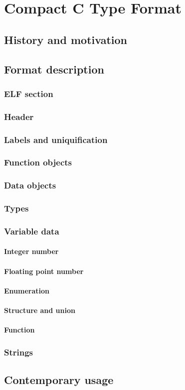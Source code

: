 \chapter{Compact C Type Format}

\section{History and motivation}
\section{Format description}
\subsection{ELF section}
\subsection{Header}
\subsection{Labels and uniquification}
\subsection{Function objects}
\subsection{Data objects}
\subsection{Types}
\subsection{Variable data}
\subsubsection{Integer number}
\subsubsection{Floating point number}
\subsubsection{Enumeration}
\subsubsection{Structure and union}
\subsubsection{Function}
\subsection{Strings}
\section{Contemporary usage}

